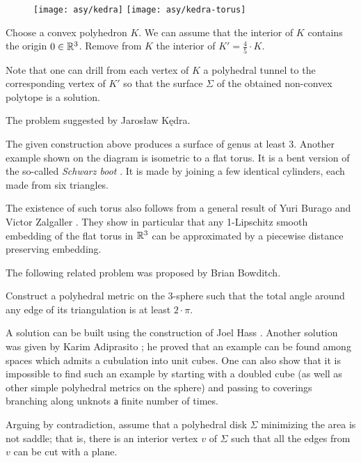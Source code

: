 {

\begin{wrapfigure}{r}{43 mm}
\vskip-2mm
\centering
\texttt{[image: asy/kedra]}
\bigskip
\texttt{[image: asy/kedra-torus]}
\end{wrapfigure}

\medskip

Choose a convex polyhedron $K$.
We can assume that the interior of $K$ contains the origin $0\in\mathbb{R}^3$.
Remove from $K$ the interior of $K'=\tfrac45\cdot K$.

Note that one can drill from each vertex of $K$ a polyhedral tunnel to the corresponding vertex of $K'$
so that the surface $\Sigma$ of the obtained non-convex polytope is a solution.
\qeds

The problem suggested by Jaros{\l}aw K\k{e}dra.

The given construction above produces a surface of genus at least 3.
Another example shown on the diagram is isometric to a flat torus.
It is a bent version of the so-called \emph{Schwarz boot} \cite{schwarz1890definition}.
It is made by joining a few identical cylinders, each made from six triangles.

The existence of such torus also follows from a general result of Yuri Burago and Victor Zalgaller \cite{burago-zalgaller:pl}.
They show in particular that any 1-Lipschitz smooth embedding of the flat torus in $\mathbb{R}^3$ can be approximated by a piecewise distance preserving embedding.

}


The following related problem was proposed by Brian Bowditch.

\begin{pr}
Construct a polyhedral metric on the 3-sphere such that the total angle around any edge of its triangulation is at least $2\cdot\pi$.
\end{pr}

A solution can be built using the construction of Joel Hass \cite{hass}.
Another solution was given by Karim Adiprasito \cite{adiprasito};
he proved that an example can be found among spaces which admits a cubulation into unit cubes.
One can also show that it is impossible to find such an example by starting with a doubled cube (as well as other simple polyhedral metrics on the sphere) and passing to coverings branching along unknots а finite number of times.


Arguing by contradiction, 
assume that a polyhedral disk $\Sigma$ minimizing the area is not saddle;
that is, there is an interior vertex $v$ of $\Sigma$ such that all the edges from $v$ can be cut with a plane.

